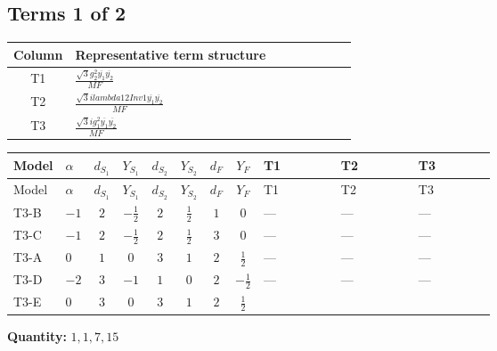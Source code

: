 \documentclass[8pt]{article}
\begin{document}
\begin{landscape}
\subsection*{Terms 1 of 2}
\begin{center}
\begin{tabular}{@{}c >{\raggedright\arraybackslash}p{0.82\linewidth}@{}}
\toprule
Column & Representative term structure \\
\midrule
T1 & \(\displaystyle \frac{\sqrt{3} g_{2}^{2} \overline{y_{1}} \overline{y_{2}}}{MF}\) \\
\midrule
T2 & \(\displaystyle \frac{\sqrt{3} i lambda12Inv1 \overline{y_{1}} \overline{y_{2}}}{MF}\) \\
\midrule
T3 & \(\displaystyle \frac{\sqrt{3} i g_{1}^{2} \overline{y_{1}} \overline{y_{2}}}{MF}\) \\
\midrule
\bottomrule
\end{tabular}
\end{center}
\smallskip
\tiny
\begin{longtable}{@{}llcccccc >{\raggedright\arraybackslash}p{0.21\linewidth} >{\raggedright\arraybackslash}p{0.21\linewidth} >{\raggedright\arraybackslash}p{0.21\linewidth}@{}}
\toprule
Model & $\alpha$ & $d_{S_1}$ & $Y_{S_1}$ & $d_{S_2}$ & $Y_{S_2}$ & $d_F$ & $Y_F$ & T1 & T2 & T3 \\
\midrule
\endfirsthead
\toprule
Model & $\alpha$ & $d_{S_1}$ & $Y_{S_1}$ & $d_{S_2}$ & $Y_{S_2}$ & $d_F$ & $Y_F$ & T1 & T2 & T3 \\
\midrule
\endhead
T3-B & $-1$ & $2$ & $-\frac{1}{2}$ & $2$ & $\frac{1}{2}$ & $1$ & $0$ & --- & --- & --- \\
\midrule
T3-C & $-1$ & $2$ & $-\frac{1}{2}$ & $2$ & $\frac{1}{2}$ & $3$ & $0$ & --- & --- & --- \\
\midrule
T3-A & $0$ & $1$ & $0$ & $3$ & $1$ & $2$ & $\frac{1}{2}$ & --- & --- & --- \\
\midrule
T3-D & $-2$ & $3$ & $-1$ & $1$ & $0$ & $2$ & $-\frac{1}{2}$ & --- & --- & --- \\
\midrule
T3-E & $0$ & $3$ & $0$ & $3$ & $1$ & $2$ & $\frac{1}{2}$ & \scriptsize\adjustbox{max width=\linewidth}{$\begin{gathered} \frac{\sqrt{3} g_{2}^{2} \overline{y_{1}} \overline{y_{2}}}{6 MF}\end{gathered}$} & \scriptsize\adjustbox{max width=\linewidth}{$\begin{gathered} - \frac{\sqrt{3} i lambda12Inv1 \overline{y_{1}} \overline{y_{2}}}{6 MF}\end{gathered}$} & \scriptsize\adjustbox{max width=\linewidth}{$\begin{gathered} \frac{\sqrt{3} i g_{1}^{2} \overline{y_{1}} \overline{y_{2}}}{8 MF}\end{gathered}$} \\
\midrule
\bottomrule
\end{longtable}
\clearpage
\noindent\textbf{Quantity: }$\mathrm{1,1,7,15}$\par\smallskip

\end{landscape}
\end{document}
